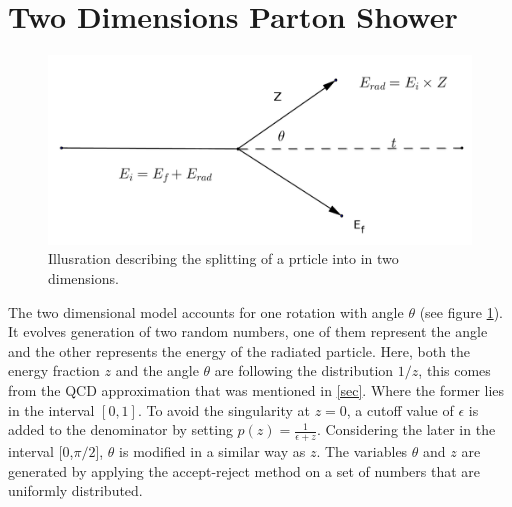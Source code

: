 %
%
%
%
%
%
%
%
%
%
%
\section{Two Dimensions Parton Shower}
\begin{figure}[hbtp]
\centering
\includegraphics[scale=.35]{images/tt.png}
\caption{Illusration describing the splitting of a prticle into in two dimensions.}\label{fig:tt}
\end{figure}

The two dimensional model accounts for one rotation with angle $\theta$ (see figure \ref{fig:tt}). It evolves generation of two random numbers, one of them represent the angle and the other represents the energy of the radiated particle. Here, both the energy fraction $z$ and the angle $\theta$ are following the distribution $1/z$, this comes from the QCD approximation that was mentioned in \ref{sec}.  Where the former lies in the interval $[0, 1]$. To avoid the singularity at $z = 0$, a cutoff value of $\epsilon$ is added to the denominator by setting  $p(z) = \frac{1}{\epsilon + z}$. Considering the later in the interval [0,$\pi/2$], $\theta$ is modified in a similar way as $z$. The variables $\theta$ and $z$ are generated by applying the accept-reject method on a set of numbers that are uniformly distributed.

